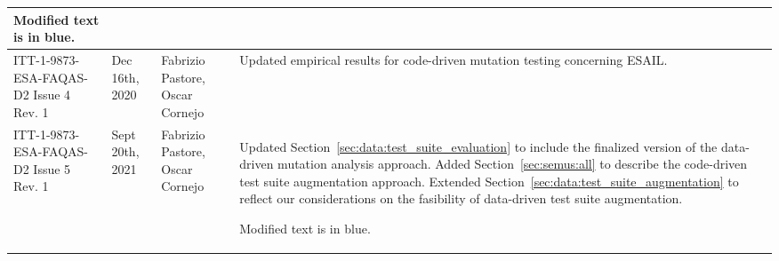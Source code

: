 \begin{longtable}{|p{2cm}|p{1cm}|p{1.5cm}|p{9cm}|@{}}
\begin{minipage}{8cm}
Modified text is in blue.
\end{minipage}

\\
\hline


ITT-1-9873-ESA-FAQAS-D2
Issue 4 Rev. 1
&Dec 16th, 2020
&Fabrizio Pastore, Oscar Cornejo
&
\begin{minipage}{8cm}
Updated empirical results for code-driven mutation testing concerning ESAIL.
\end{minipage}
\\

\hline

ITT-1-9873-ESA-FAQAS-D2
Issue 5 Rev. 1
&Sept 20th, 2021
&Fabrizio Pastore, Oscar Cornejo
&
\begin{minipage}{8cm}
Updated Section~\ref{sec:data:test_suite_evaluation} to include the finalized version of the data-driven mutation analysis approach.
Added Section~\ref{sec:semus:all} to describe the code-driven test suite augmentation approach.
Extended Section~\ref{sec:data:test_suite_augmentation} to reflect our considerations on the fasibility of data-driven test suite augmentation.

Modified text is in blue.
\end{minipage}
\\

\hline
                                                    
\end{longtable}
\normalsize

\clearpage